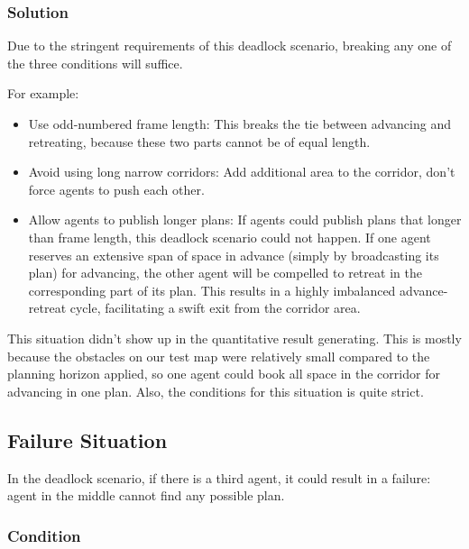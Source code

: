 \subsubsection{Solution}

Due to the stringent requirements of this deadlock scenario, breaking any one of the three conditions will suffice.

For example:
\begin{itemize}
    \item Use odd-numbered frame length: This breaks the tie between advancing and retreating, because these two parts cannot be of equal length.
    \item Avoid using long narrow corridors: Add additional area to the corridor, don't force agents to push each other.
    \item Allow agents to publish longer plans: If agents could publish plans that longer than frame length, this deadlock scenario could not happen.
     If one agent reserves an extensive span of space in advance (simply by broadcasting its plan) for advancing, the other agent will be compelled to retreat in the corresponding part of its plan. This results in a highly imbalanced advance-retreat cycle, facilitating a swift exit from the corridor area.
\end{itemize}

This situation didn't show up in the quantitative result generating. This is mostly because the obstacles on our test map were relatively small compared to the planning horizon applied, so one agent could book all space in the corridor for advancing in one plan. Also, the conditions for this situation is quite strict.

\subsection{Failure Situation}

In the deadlock scenario, if there is a third agent, it could result in a failure: agent in the middle cannot find any possible plan.

\subsubsection{Condition}

